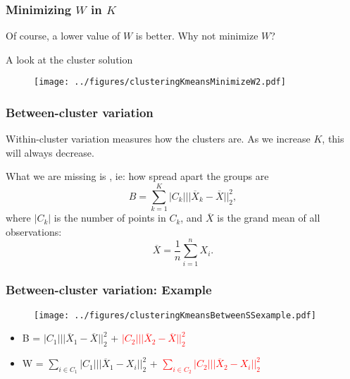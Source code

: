 \documentclass{beamer}
\begin{document}
\begin{frame}[fragile]
\frametitle{Minimizing $W$ in $K$}
Of course, a lower value of $W$ is better.  Why not minimize $W$?

\vsp
A look at the cluster solution

\begin{figure}[h!]
  \centering
  \texttt{[image: ../figures/clusteringKmeansMinimizeW2.pdf]}
\end{figure}
\end{frame}

\begin{frame}[fragile]
\frametitle{Between-cluster variation}
Within-cluster variation measures how  the clusters are.  As 
we increase $K$, this will always decrease.  
\vsp

What we are missing is , ie: how spread apart the groups are
\[
B = \sum_{k=1}^K |C_k| ||\overline{X}_k - \overline{X} ||_2^2,
\]
where $|C_k|$ is the number of points in $C_k$, and $\overline{X}$ is the grand mean
of all observations:
\[
\overline{X} = \frac{1}{n} \sum_{i=1}^n X_i.
\]
\end{frame}

\begin{frame}[fragile]
\frametitle{Between-cluster variation: Example}
\begin{figure}[h!]
  \centering
\texttt{[image: ../figures/clusteringKmeansBetweenSSexample.pdf]}
\end{figure}
\begin{itemize}
\item[] B = \textcolor{green!65!black}{$|C_1| ||\overline{X}_1 - \overline{X} ||_2^2$} +
\textcolor{red}{$|C_2| ||\overline{X}_2 - \overline{X} ||_2^2$}
\item[] W = \textcolor{green!65!black}{$\sum_{i \in C_1} |C_1| ||\overline{X}_1 - X_i ||_2^2$} +
\textcolor{red}{$\sum_{i \in C_2} |C_2| ||\overline{X}_2 - X_i ||_2^2$}
\end{itemize}
\end{frame}


%
\end{document}
